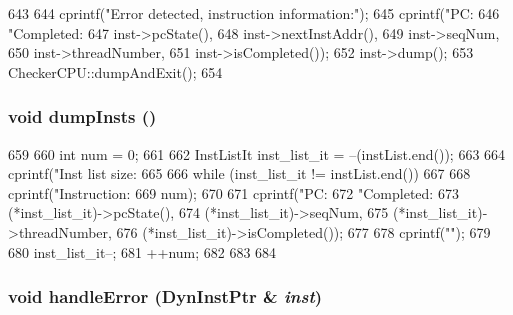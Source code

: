 \begin{DoxyCode}
643 {
644     cprintf("Error detected, instruction information:\n");
645     cprintf("PC:%
646             "Completed:%
647             inst->pcState(),
648             inst->nextInstAddr(),
649             inst->seqNum,
650             inst->threadNumber,
651             inst->isCompleted());
652     inst->dump();
653     CheckerCPU::dumpAndExit();
654 }
\end{DoxyCode}
\hypertarget{classChecker_a80587b4fe043bbe1995536cb3b361588}{
\subsubsection[{dumpInsts}]{\setlength{\rightskip}{0pt plus 5cm}void dumpInsts ()}}
\label{classChecker_a80587b4fe043bbe1995536cb3b361588}



\begin{DoxyCode}
659 {
660     int num = 0;
661 
662     InstListIt inst_list_it = --(instList.end());
663 
664     cprintf("Inst list size: %
665 
666     while (inst_list_it != instList.end())
667     {
668         cprintf("Instruction:%
669                 num);
670 
671         cprintf("PC:%
672                 "Completed:%
673                 (*inst_list_it)->pcState(),
674                 (*inst_list_it)->seqNum,
675                 (*inst_list_it)->threadNumber,
676                 (*inst_list_it)->isCompleted());
677 
678         cprintf("\n");
679 
680         inst_list_it--;
681         ++num;
682     }
683 
684 }
\end{DoxyCode}
\hypertarget{classChecker_a761ba7749af782d41357ddb6bffb7bd7}{
\subsubsection[{handleError}]{\setlength{\rightskip}{0pt plus 5cm}void handleError ({\bf DynInstPtr} \& {\em inst})}}
\label{classChecker_a761ba7749af782d41357ddb6bffb7bd7}



